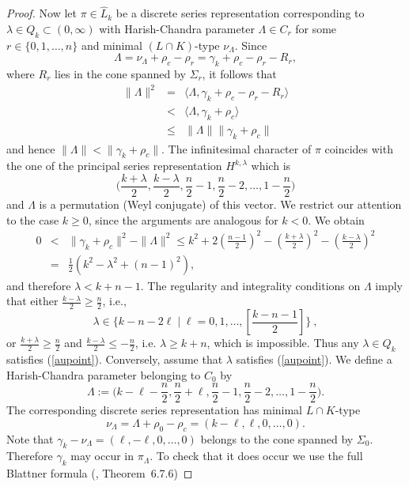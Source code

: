 \documentclass[10]{amsart}
\theoremstyle{remark}
\theoremstyle{definition}
\numberwithin{equation}{section}
\newcommand{\be}{\begin{equation}}
\newcommand{\beu}{\begin{equation*}}
\newcommand{\defn}{{:=}}
\begin{document}
{\begin{proof}
Now let $\pi\in\widehat L_k$ be a discrete series representation corresponding to $\lambda\in Q_k\subset (0,\infty)$ with Harish-Chandra parameter 
$\Lambda\in C_r$ for some $r\in\{0,1,\dots,n\}$ and minimal $(L\cap K)$-type $\nu_\Lambda$. Since 
$$\Lambda=\nu_\Lambda+\rho_c-\rho_r=\gamma_k+\rho_c-\rho_r-R_r,$$ 
where $R_r$ lies in the cone spanned by $\Sigma_r$, it follows that
%
\begin{eqnarray*}
\|\Lambda\|^2&=&\langle \Lambda,\gamma_k+\rho_c-\rho_r-R_r\rangle\\
&<&\langle \Lambda,\gamma_k+\rho_c\rangle\\
&\le& \|\Lambda\| \|\gamma_k+\rho_c\|
\end{eqnarray*}
%
and hence $\|\Lambda\|< \|\gamma_k+\rho_c\|$. The infinitesimal character of $\pi$ coincides with the one of the principal series representation $H^{k,\lambda}$ which is
%
\beu
\big (\frac{k+\lambda}{2},\frac{k-\lambda}{2},\frac{n}{2}-1,\frac{n}{2}-2,\dots,1-\frac{n}{2}\big )
\end{equation*}
%
and $\Lambda$ is a permutation (Weyl conjugate) of this vector. We restrict our attention to the case $k\geq 0$, since the arguments are analogous for $k<0$. 
We obtain
%
\begin{eqnarray*}
0&<&  \|\gamma_k+\rho_c\|^2-\|\Lambda\|^2 
\le k^2 +2\left (\frac{n-1}{2}\right )^2 -\left (\frac{k+\lambda}{2}\right )^2 -\left (\frac{k-\lambda}{2}\right )^2\\
&=&\frac{1}{2}\left (k^2-\lambda^2+(n-1)^2 \right ),
\end{eqnarray*}
%
and therefore $\lambda< k+n-1$. The regularity and integrality conditions on $\Lambda$ imply that either $\frac{k-\lambda}{2}\geq\frac{n}{2}$, i.e.,
%
\be\label{aupoint}
\lambda\in\Big\{k-n-2\ell\mid \ell=0,1,\dots,\left [ \frac{k-n-1}{2}\right ]\Big\}\ ,
\end{equation}
%
or $\frac{k+\lambda}{2}\geq\frac{n}{2}$ and $\frac{k-\lambda}{2}\le-\frac{n}{2}$, i.e.
$
\lambda\geq k+n
$, which is impossible. Thus any $\lambda\in Q_k$ satisfies (\ref{aupoint}). Conversely, assume that $\lambda$ satisfies (\ref{aupoint}).
We define a Harish-Chandra parameter belonging to $C_0$ by 
%
$$\Lambda\defn\big (k-\ell-\frac{n}{2},\frac{n}{2}+\ell,\frac{n}{2}-1,\frac{n}{2}-2,\dots,1-\frac{n}{2}\big ).$$
%
The corresponding discrete series representation has minimal $L\cap K$-type
%
$$ \nu_{\Lambda}=\Lambda+\rho_0-\rho_c=(k-\ell,\ell,0,\dots,0).$$
%
Note that $\gamma_k-\nu_{\Lambda}=(\ell,-\ell,0,\dots,0)$ belongs to the cone spanned by $\Sigma_0$.
Therefore $\gamma_k$ may occur in  $\pi_{\Lambda}$. To check that it does occur we use the full Blattner formula (\cite{Wa88}, Theorem~6.7.6)

\end{proof}}
\end{document}
